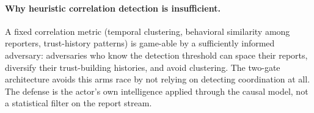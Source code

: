 \paragraph{Why heuristic correlation detection is insufficient.} A fixed
correlation metric (temporal clustering, behavioral similarity among
reporters, trust-history patterns) is game-able by a sufficiently
informed adversary: adversaries who know the detection threshold can
space their reports, diversify their trust-building histories, and
avoid clustering. The two-gate architecture avoids this arms
race by not relying on detecting coordination at all. The defense is the
actor's own intelligence applied through the causal model, not a statistical
filter on the report stream.
